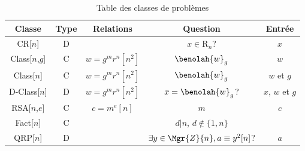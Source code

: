 
\begin{table}[!htb]
	\centering
	\caption{Table des classes de problèmes}
	\label{tab:classes}
	\begin{tabular}{|c|c|c|c|c|}
		\hline
		Classe      	& Type\footnotemark[2]	 &Relations              & Question                  & Entrée		     	\\
		\hline
		\hline
		CR[$n$]       	& D			 &                        & $x\in\mathrm{R}_n$?    & $x$	           	\\
		Class[$n$,$g$]  & C			 & $w = g^mr^n [n^2]$     & $\benolah{w}_g$        & $w$	          	\\
		Class[$n$]      & C			 & $w = g^mr^n [n^2]$     & $\benolah{w}_g$        & $w$ et $g$	          	\\
		D-Class[$n$]  	& D			 & $w = g^mr^n [n^2]$     & $x = \benolah{w}_g$?   & $x$, $w$ et $g$	   	\\
		\hline
		RSA[$n$,$e$]    & C			 & $c = m^e    [n]$       & $m$                    & $c$	 		\\
		Fact[$n$]     	& C			 & 			  & $d|n$, $d\not\in \{1,n\}$     & 	 			\\
		QRP[$n$]	& D			 & 			  & $\exists y\in\Mgr{Z}{n}, a\equiv y^2 [n]$? & $a$		\\
		\hline
	\end{tabular}
\end{table}

%	
%
%
%

